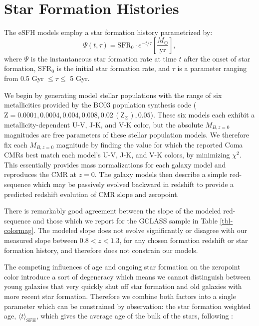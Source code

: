 
\appendix



\chapter{Star Formation Histories}\label{appendix}

The eSFH models employ a star formation history parametrized by:
\begin{equation}\label{eq-esfh}
\Psi(t,\tau) = \mathrm{SFR}_0\cdot e^{-t/\tau} \left[ \frac{M_{\odot}}{\mathrm{yr}} \right],
\end{equation}
where $\Psi$ is the instantaneous star formation rate at time $t$ after the onset of star formation, SFR$_0$ is the initial star formation rate, and $\tau$ is a parameter ranging from 0.5 Gyr $\leq \tau \leq$ 5 Gyr.

We begin by generating model stellar populations with the range of six metallicities provided by the BC03 population synthesis code ($\mathrm{Z} = 0.0001, 0.0004, 0.004, 0.008, 0.02\, (\mathrm{Z}_\odot) , 0.05$). These six models each exhibit a metallicity-dependent U-V, J-K, and V-K color, but the absolute $M_{B,z=0}$ magnitudes are free parameters of these stellar population models.
We therefore fix each $M_{B,z=0}$ magnitude by finding the value for which the reported Coma CMRs \citep{Bower:1992mb} best match each model's U-V, J-K, and V-K colors, by minimizing $\chi^2$.
This essentially provides mass normalizations for each galaxy model and reproduces the CMR at $z=0$. The galaxy models then describe a simple red-sequence which may be passively evolved backward in redshift to provide a predicted redshift evolution of CMR slope and zeropoint.

There is remarkably good agreement between the slope of the modeled red-sequence and those which we report for the GCLASS sample in Table \ref{tbl-colormag}. The modeled slope does not evolve significantly or disagree with our measured slope between $0.8 < z < 1.3$, for any chosen formation redshift or star formation history, and therefore does not constrain our models.

The competing influences of age and ongoing star formation on the zeropoint color introduce a sort of degeneracy which means we cannot distinguish between young galaxies that very quickly shut off star formation and old galaxies with more recent star formation. Therefore we combine both factors into a single parameter which can be constrained by observation: the star formation weighted age, $\langle t \rangle_\mathrm{SFH}$, which gives the average age of the bulk of the stars, following \citet{Rettura:2011aa}:

